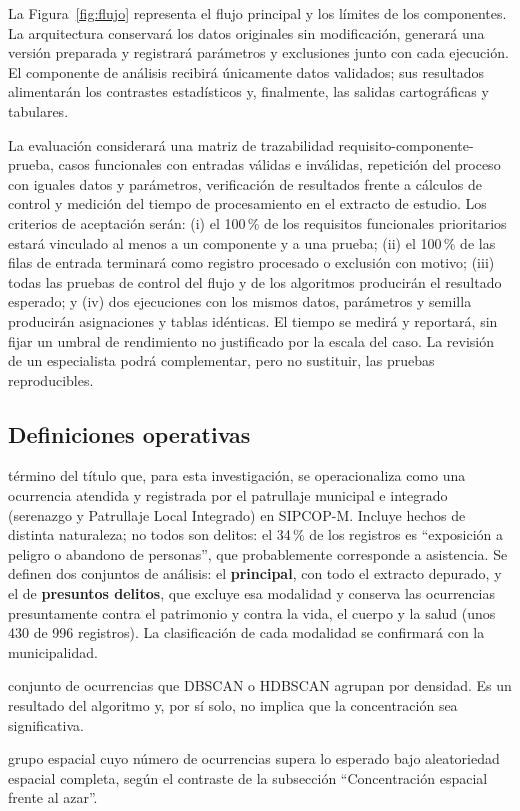 La Figura~\ref{fig:flujo} representa el flujo principal y los límites de los componentes. La arquitectura conservará los datos originales sin modificación, generará una versión preparada y registrará parámetros y exclusiones junto con cada ejecución. El componente de análisis recibirá únicamente datos validados; sus resultados alimentarán los contrastes estadísticos y, finalmente, las salidas cartográficas y tabulares.

La evaluación considerará una matriz de trazabilidad requisito-componente-prueba, casos funcionales con entradas válidas e inválidas, repetición del proceso con iguales datos y parámetros, verificación de resultados frente a cálculos de control y medición del tiempo de procesamiento en el extracto de estudio. Los criterios de aceptación serán: (i) el 100\,\% de los requisitos funcionales prioritarios estará vinculado al menos a un componente y a una prueba; (ii) el 100\,\% de las filas de entrada terminará como registro procesado o exclusión con motivo; (iii) todas las pruebas de control del flujo y de los algoritmos producirán el resultado esperado; y (iv) dos ejecuciones con los mismos datos, parámetros y semilla producirán asignaciones y tablas idénticas. El tiempo se medirá y reportará, sin fijar un umbral de rendimiento no justificado por la escala del caso. La revisión de un especialista podrá complementar, pero no sustituir, las pruebas reproducibles.

\subsection{Definiciones operativas}

\begin{description}[leftmargin=0pt,labelindent=0pt,font=\bfseries]
\item[\termref{term-incident}{Incidente de seguridad ciudadana}:] término del título que, para esta investigación, se operacionaliza como una ocurrencia atendida y registrada por el patrullaje municipal e integrado (serenazgo y Patrullaje Local Integrado) en SIPCOP-M. Incluye hechos de distinta naturaleza; no todos son delitos: el 34\,\% de los registros es ``exposición a peligro o abandono de personas'', que probablemente corresponde a asistencia. Se definen dos conjuntos de análisis: el \textbf{principal}, con todo el extracto depurado, y el de \textbf{presuntos delitos}, que excluye esa modalidad y conserva las ocurrencias presuntamente contra el patrimonio y contra la vida, el cuerpo y la salud (unos 430 de 996 registros). La clasificación de cada modalidad se confirmará con la municipalidad.
\item[\termref{term-spatial-cluster}{Grupo espacial (clúster)}:] conjunto de ocurrencias que DBSCAN o HDBSCAN agrupan por densidad. Es un resultado del algoritmo y, por sí solo, no implica que la concentración sea significativa.
\item[\termref{term-hotspot}{Hotspot}:] grupo espacial cuyo número de ocurrencias supera lo esperado bajo aleatoriedad espacial completa, según el contraste de la subsección ``Concentración espacial frente al azar''.
\end{description}

